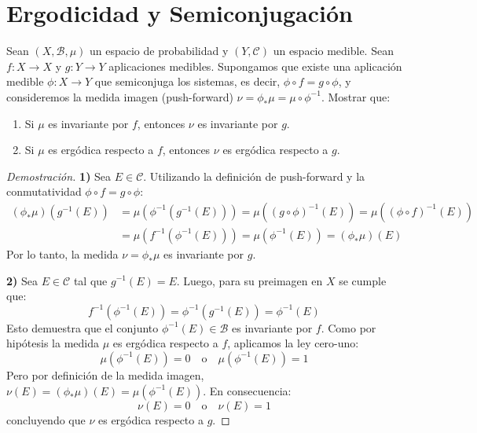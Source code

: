 \section{Ergodicidad y Semiconjugación}

\begin{proposicion}
	Sean $(X, \mathcal{B}, \mu)$ un espacio de probabilidad y $(Y, \mathcal{C})$ un espacio medible. Sean $f: X \to X$ y $g: Y \to Y$ aplicaciones medibles. Supongamos que existe una aplicación medible $\phi: X \to Y$ que semiconjuga los sistemas, es decir, $\phi \circ f = g \circ \phi$, y consideremos la medida imagen (push-forward) $\nu = \phi_* \mu = \mu \circ \phi^{-1}$. Mostrar que:
	\begin{enumerate}[1)]
		\item Si $\mu$ es invariante por $f$, entonces $\nu$ es invariante por $g$.
		\item Si $\mu$ es ergódica respecto a $f$, entonces $\nu$ es ergódica respecto a $g$.
	\end{enumerate}
\end{proposicion}
\begin{proof}[Demostración]
	\textbf{1)} Sea $E \in \mathcal{C}$. Utilizando la definición de push-forward y la conmutatividad $\phi \circ f = g \circ \phi$:
	\begin{align*}
		(\phi_* \mu)(g^{-1}(E)) &= \mu(\phi^{-1}(g^{-1}(E))) = \mu((g \circ \phi)^{-1}(E)) = \mu((\phi \circ f)^{-1}(E)) \\
		&= \mu(f^{-1}(\phi^{-1}(E))) = \mu(\phi^{-1}(E)) = (\phi_* \mu)(E)
	\end{align*}
	Por lo tanto, la medida $\nu = \phi_* \mu$ es invariante por $g$.
	
	\textbf{2)} Sea $E \in \mathcal{C}$ tal que $g^{-1}(E) = E$. Luego, para su preimagen en $X$ se cumple que:
	$$ f^{-1}(\phi^{-1}(E)) = \phi^{-1}(g^{-1}(E)) = \phi^{-1}(E) $$
	Esto demuestra que el conjunto $\phi^{-1}(E) \in \mathcal{B}$ es invariante por $f$. Como por hipótesis la medida $\mu$ es ergódica respecto a $f$, aplicamos la ley cero-uno:
	$$ \mu(\phi^{-1}(E)) = 0 \quad \text{o} \quad \mu(\phi^{-1}(E)) = 1 $$
	Pero por definición de la medida imagen, $\nu(E) = (\phi_* \mu)(E) = \mu(\phi^{-1}(E))$. En consecuencia:
	$$ \nu(E) = 0 \quad \text{o} \quad \nu(E) = 1 $$
	concluyendo que $\nu$ es ergódica respecto a $g$.
\end{proof}

